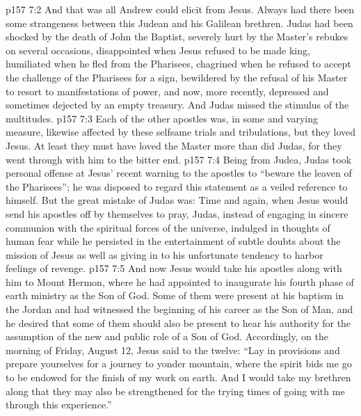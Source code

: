 \vs p157 7:2 And that was all Andrew could elicit from Jesus. Always had there been some strangeness between this Judean and his Galilean brethren. Judas had been shocked by the death of John the Baptist, severely hurt by the Master’s rebukes on several occasions, disappointed when Jesus refused to be made king, humiliated when he fled from the Pharisees, chagrined when he refused to accept the challenge of the Pharisees for a sign, bewildered by the refusal of his Master to resort to manifestations of power, and now, more recently, depressed and sometimes dejected by an empty treasury. And Judas missed the stimulus of the multitudes.
\vs p157 7:3 Each of the other apostles was, in some and varying measure, likewise affected by these selfsame trials and tribulations, but they loved Jesus. At least they must have loved the Master more than did Judas, for they went through with him to the bitter end.
\vs p157 7:4 Being from Judea, Judas took personal offense at Jesus’ recent warning to the apostles to \textcolor{ubdarkred}{“beware the leaven of the Pharisees”;} he was disposed to regard this statement as a veiled reference to himself. But the great mistake of Judas was: Time and again, when Jesus would send his apostles off by themselves to pray, Judas, instead of engaging in sincere communion with the spiritual forces of the universe, indulged in thoughts of human fear while he persisted in the entertainment of subtle doubts about the mission of Jesus as well as giving in to his unfortunate tendency to harbor feelings of revenge.
\pc \vs p157 7:5 And now Jesus would take his apostles along with him to Mount Hermon, where he had appointed to inaugurate his fourth phase of earth ministry as the Son of God. Some of them were present at his baptism in the Jordan and had witnessed the beginning of his career as the Son of Man, and he desired that some of them should also be present to hear his authority for the assumption of the new and public role of a Son of God. Accordingly, on the morning of Friday, August 12, Jesus said to the twelve: \textcolor{ubdarkred}{“Lay in provisions and prepare yourselves for a journey to yonder mountain, where the spirit bids me go to be endowed for the finish of my work on earth. And I would take my brethren along that they may also be strengthened for the trying times of going with me through this experience.”}
